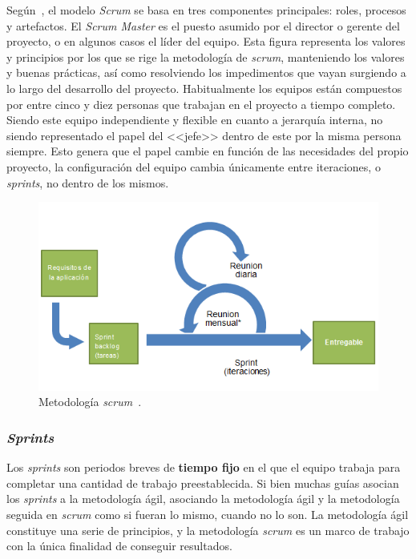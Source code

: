 Según~\cite{cervone2011understanding}, el modelo \textit{Scrum} se basa en tres componentes principales: roles, procesos y artefactos. El \textit{Scrum Master} es el puesto asumido por el director o gerente del proyecto, o en algunos casos el líder del equipo. Esta figura representa los valores y principios por los que se rige la metodología de \textit{scrum}, manteniendo los valores y buenas prácticas, así como resolviendo los impedimentos que vayan surgiendo a lo largo del desarrollo del proyecto. Habitualmente los equipos están compuestos por entre cinco y diez personas que trabajan en el proyecto a tiempo completo. Siendo este equipo independiente y flexible en cuanto a jerarquía interna, no siendo representado el papel del <<jefe>> dentro de este por la misma persona siempre. Esto genera que el papel cambie en función de las necesidades del propio proyecto, la configuración del equipo cambia únicamente entre iteraciones, o \textit{sprints}, no dentro de los mismos.

\begin{figure}[]
	\centering
	\includegraphics[scale=0.5]{../img/anexos/scrum-overview-es}
	\caption{Metodología \textit{scrum}~\cite{SCRUMWIKI}.}\label{img:scrum-overview}
\end{figure}

\subsubsection{\textit{Sprints}}
Los \textit{sprints} son periodos breves de \textbf{tiempo fijo} en el que el equipo trabaja para completar una cantidad de trabajo preestablecida. Si bien muchas guías asocian los \textit{sprints} a la metodología ágil, asociando la metodología ágil y la metodología seguida en \textit{scrum} como si fueran lo mismo, cuando no lo son. La metodología ágil constituye una serie de principios, y la metodología \textit{scrum} es un marco de trabajo con la única finalidad de conseguir resultados.

